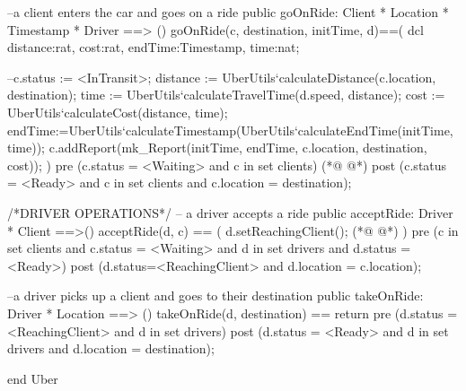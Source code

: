 \begin{vdmpp}[breaklines=true]
    --a client enters the car and goes on a ride
    public goOnRide: Client * Location * Timestamp * Driver ==> ()
        goOnRide(c, destination, initTime, d)==(
            dcl distance:rat, cost:rat, endTime:Timestamp, time:nat;
            
            --c.status := <InTransit>;
            distance := UberUtils`calculateDistance(c.location, destination);
            time := UberUtils`calculateTravelTime(d.speed, distance);
            cost := UberUtils`calculateCost(distance, time);
            endTime:=UberUtils`calculateTimestamp(UberUtils`calculateEndTime(initTime, time));
            c.addReport(mk_Report(initTime, endTime, c.location, destination, cost));
        ) pre (c.status = <Waiting> and c in set clients) 
(*@
\label{acceptRide:80}
@*)
        post (c.status = <Ready> and c in set clients and c.location = destination);
    
    /*DRIVER OPERATIONS*/
    -- a driver accepts a ride
    public acceptRide: Driver * Client ==>()
        acceptRide(d, c) == (
            d.setReachingClient();
(*@
\label{takeOnRide:87}
@*)
        )    
        pre (c in set clients and c.status = <Waiting> and d in set drivers and d.status = <Ready>)
        post (d.status=<ReachingClient> and d.location = c.location); 
    
    --a driver picks up a client and goes to their destination
    public takeOnRide: Driver * Location ==> ()
        takeOnRide(d, destination) ==
            return
        pre (d.status = <ReachingClient> and d in set drivers)
        post (d.status = <Ready> and d in set drivers and d.location = destination);
    
end Uber
\end{vdmpp}
